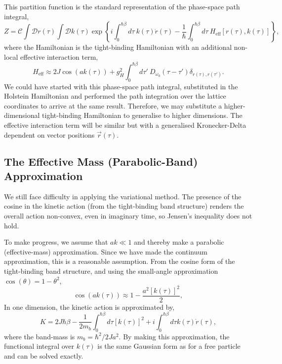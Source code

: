 This partition function is the standard representation of the phase-space path integral, 
\begin{equation}
    Z = \mathcal{C} \int \mathcal{D}r(\tau) \int \mathcal{D}k(\tau) \exp\left\{i \int_0^{\hbar\beta} d\tau\ k(\tau) \Dot{r}(\tau) - \frac{1}{\hbar}\int_0^{\hbar\beta} d\tau\ H_{\text{eff}}[r(\tau), k(\tau)] \right\} ,
\end{equation}
where the Hamiltonian is the tight-binding Hamiltonian with an additional non-local effective interaction term,
\begin{equation}
    H_{\text{eff}} \approx 2J \cos(a k(\tau)) + g_H^2 \int_0^{\hbar\beta} d\tau'\
    D_{\omega_0} (\tau - \tau') \delta_{r(\tau),r(\tau')} .
\end{equation}
We could have started with this phase-space path integral, substituted in the Holstein Hamiltonian and performed the path integration over the lattice coordinates to arrive at the same result. Therefore, we may substitute a higher-dimensional tight-binding Hamiltonian to generalise to higher dimensions. 
The effective interaction term will be similar but with a generalised Kronecker-Delta dependent on vector positions $\Vec{r}(\tau)$.

\subsection{The Effective Mass (Parabolic-Band) Approximation}

We still face difficulty in applying the variational method. The presence of the cosine in the kinetic action (from the tight-binding band structure) renders the overall action non-convex, even in imaginary time, so Jensen's inequality does not hold. 

To make progress, we assume that $a k \ll 1$ and thereby make a parabolic (effective-mass) approximation. Since we have made the continuum approximation, this is a reasonable assumption. From the cosine form of the tight-binding band structure, and using the small-angle approximation $\cos(\theta) = 1-\theta^2$, 
\begin{equation}
    \cos(a k(\tau)) \approx 1 - \frac{a^2 [k(\tau)]^2}{2} ,
\end{equation}
In one dimension, the kinetic action is approximated by,
\begin{equation}
    K = 2 J \hbar \beta - \frac{1}{2 m_b} \int_0^{\hbar\beta} d\tau \left[k(\tau)\right]^2 + i \int_0^{\hbar\beta} d\tau k(\tau) \Dot{r}(\tau) ,
\end{equation}
where the band-mass is $m_b = \hbar^2 / 2 J a^2$. By making this approximation, the functional integral over $k(\tau)$ is the same Gaussian form as for a free particle and can be solved exactly. 

